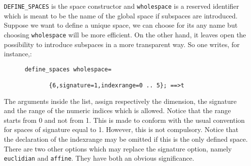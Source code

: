 \texttt{DEFINE\_SPACES} is the space constructor and
\texttt{wholespace}
is a reserved identifier which is meant to be the name of the global space
if subspaces are introduced.
Suppose we want to define a unique space, we can choose for its any name but
choosing \texttt{wholespace} will be more efficient. On the other hand, it leaves
open the possibility to introduce subspaces in a more transparent way.
So one writes, for instance,:
\begin{verbatim}
      define_spaces wholespace=

             {6,signature=1,indexrange=0 .. 5}; ==>t
\end{verbatim} 
The arguments inside the list, assign respectively the dimension, the signature
and the range of the numeric indices which is allowed.
Notice that the range starts from 0 and not from 1. This is made to conform with
the usual convention for spaces of signature equal to 1. However, this is not
compulsory.
Notice that the declaration of the indexrange may be omitted if this is the
only  defined space.
There are two other options which may replace the signature option, namely
\texttt{euclidian} and \texttt{affine}. They
have both an obvious significance.

